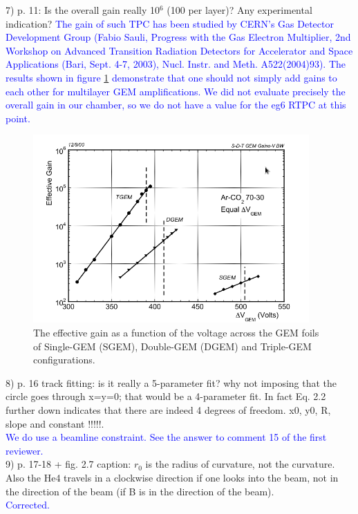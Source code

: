 7) p. 11: Is the overall gain really 10$^6$ (100 per layer)? Any experimental 
indication?
\textcolor{blue}{
     The gain of such TPC has been studied by CERN's Gas Detector Development 
Group (Fabio Sauli, Progress with the Gas Electron Multiplier, 2nd Workshop on 
Advanced Transition Radiation Detectors for Accelerator and Space Applications 
(Bari, Sept. 4-7, 2003), Nucl. Instr. and Meth. A522(2004)93). The results 
shown in figure \ref{fig:gem_gains} demonstrate that one should not simply add 
gains to each other for multilayer GEM amplifications. We did not evaluate 
precisely the overall gain in our chamber, so we do not have a value for the 
eg6 RTPC at this point.}\\


\begin{figure}[h!]
\centering
\includegraphics[height=7.2cm]{fig/GEM_gains.png}
\caption{ The effective gain as a function of the voltage across the GEM foils 
of Single-GEM (SGEM), Double-GEM (DGEM) and Triple-GEM configurations.}
\label{fig:gem_gains}
\end{figure}


8) p. 16 track fitting: is it really a 5-parameter fit? why not imposing that the 
circle goes through x=y=0; that would be a 4-parameter fit. In fact Eq. 2.2 
further down indicates that there are indeed 4 degrees of freedom.
    x0, y0, R, slope and constant !!!!!.\\
   \textcolor{blue}{We do use a beamline constraint. See the answer to comment 
   15 of the first reviewer.}\\

9) p. 17-18 + fig. 2.7 caption: $r_{0}$ is the radius of curvature, not the curvature. 
Also the He4 travels in a clockwise direction if one looks into the beam, not 
in the direction of the beam (if B is in the direction of the beam).\\
\textcolor{blue}{  Corrected.}\\


